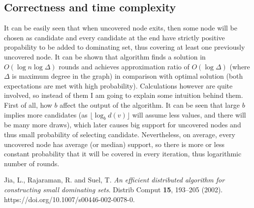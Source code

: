 \documentclass[12pt, a4paper]{article}
\begin{document}
\subsection*{Correctness and time complexity}
It can be easily seen that when uncovered node exits, then some node will be chosen as candidate and every candidate at the end have strictly positive propability to be added to dominating set, thus covering at least one previously uncovered node.
It can be shown that algorithm finds a solution in $O(\log{n}\log{\Delta})$ rounds and achieves approximation ratio of $O(\log{\Delta})$ (where $\Delta$ is maximum degree in the graph) in comparison with optimal solution (both expectations are met with high probability).
Calculations however are quite involved, so instead of them I am going to explain some intuition behind them. First of all, how $b$ affect the output of the algorithm. It can be seen that large $b$ implies more candidates (as $\lfloor\log_b{d(v)}\rfloor$ will assume less values, and there will be many more draws), which
later causes big support for uncovered nodes and thus small probability of selecting candidate. Nevertheless, on average, every uncovered node has average (or median) support, so there is more or less constant probability that it will be covered in every iteration, thus logarithmic number of rounds.

\begin{thebibliography}{9}
 Jia, L., Rajaraman, R. and Suel, T. \textit{An efficient distributed algorithm for constructing small dominating sets}. Distrib Comput \textbf{15}, 193–205 (2002). https://doi.org/10.1007/s00446-002-0078-0.
\end{thebibliography}
\end{document}
